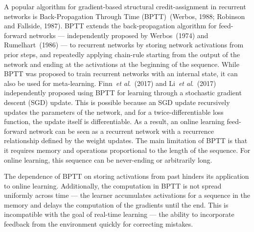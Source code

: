 \documentclass{article}
\newcommand{\etal}{\textit{et al}.}
\newcommand{\archi}{\textit{Col-NN} }
\begin{document}
A popular algorithm for gradient-based structural credit-assignment in recurrent networks is Back-Propagation Through Time (BPTT)~(Werbos, 1988; Robinson and Fallside, 1987). BPTT extends the back-propagation algorithm for feed-forward networks --- independently proposed by Werbos~(1974) and Rumelhart~(1986) --- to recurrent networks by storing network activations from prior steps, and repeatedly applying chain-rule starting from the output of the network and ending at the activations at the beginning of the sequence. While BPTT was proposed to train recurrent networks with an internal state, it can also be used for meta-learning. Finn~\etal~(2017) and Li~\etal~(2017) independently proposed using BPTT for learning through a stochastic gradient descent (SGD) update. This is possible because an SGD update recursively updates the parameters of the network, and for a twice-differentiable loss function, the update itself is differentiable. As a result, an online learning feed-forward network can be seen as a recurrent network with a recurrence relationship defined by the weight updates. The main limitation of BPTT is that it requires memory and operations proportional to the length of the sequence. For online learning, this sequence can be never-ending or arbitrarily long. 

The dependence of BPTT on storing activations from past hinders its application to online learning. Additionally, the computation in BPTT is not spread uniformly across time --- the learner accumulates activations for a sequence in the memory and delays the computation of the gradients until the end. This is incompatible with the goal of real-time learning --- the ability to incorporate feedback from the environment quickly for correcting mistakes. 
\end{document}

